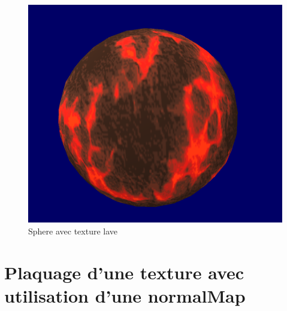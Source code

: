 \documentclass{article}
\begin{document}
\begin{figure}
    \center
    \includegraphics[scale=0.3]{sphereLava.png}
    \caption{Sphere avec texture lave}
\end{figure}

\newpage
\section{Plaquage d'une texture avec utilisation d'une normalMap}
\end{document}
